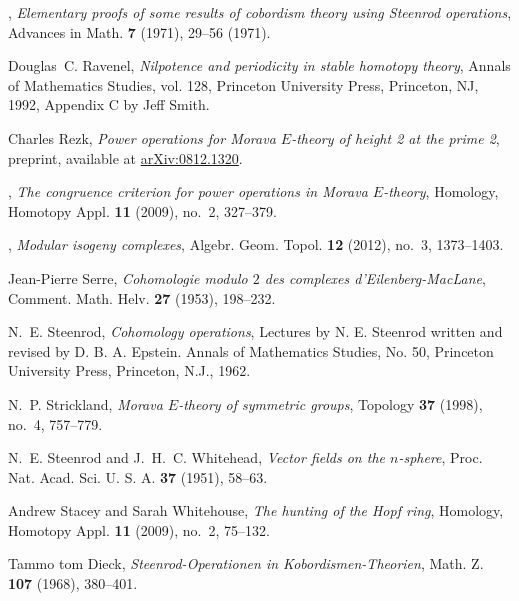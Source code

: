 \documentclass{rs}
\theoremstyle{definition}
\theoremstyle{remark}
\begin{document}
\begin{thebibliography}
\bysame, \emph{Elementary proofs of some results of cobordism theory using
  {S}teenrod operations}, Advances in Math. \textbf{7} (1971), 29--56 (1971).

Douglas~C. Ravenel, \emph{Nilpotence and periodicity in stable homotopy
  theory}, Annals of Mathematics Studies, vol. 128, Princeton University Press,
  Princeton, NJ, 1992, Appendix C by Jeff Smith. 

Charles Rezk, \emph{Power operations for {M}orava ${E}$-theory of height 2 at
  the prime 2}, preprint, available at
  \href{http://arxiv.org/abs/0812.1320}{arXiv:0812.1320}.

\bysame, \emph{The congruence criterion for power operations in {M}orava
  {$E$}-theory}, Homology, Homotopy Appl. \textbf{11} (2009), no.~2, 327--379.

\bysame, \emph{Modular isogeny complexes}, Algebr. Geom. Topol. \textbf{12}
  (2012), no.~3, 1373--1403. 

Jean-Pierre Serre, \emph{Cohomologie modulo {$2$} des complexes
  d'{E}ilenberg-{M}ac{L}ane}, Comment. Math. Helv. \textbf{27} (1953),
  198--232. 

N.~E. Steenrod, \emph{Cohomology operations}, Lectures by N. E. Steenrod
  written and revised by D. B. A. Epstein. Annals of Mathematics Studies, No.
  50, Princeton University Press, Princeton, N.J., 1962. 

N.~P. Strickland, \emph{Morava {$E$}-theory of symmetric groups}, Topology
  \textbf{37} (1998), no.~4, 757--779. 

N.~E. Steenrod and J.~H.~C. Whitehead, \emph{Vector fields on the
  {$n$}-sphere}, Proc. Nat. Acad. Sci. U. S. A. \textbf{37} (1951), 58--63.

Andrew Stacey and Sarah Whitehouse, \emph{The hunting of the {H}opf ring},
  Homology, Homotopy Appl. \textbf{11} (2009), no.~2, 75--132. 

Tammo tom Dieck, \emph{Steenrod-{O}perationen in {K}obordismen-{T}heorien},
  Math. Z. \textbf{107} (1968), 380--401. 


\end{thebibliography}
\end{document}
